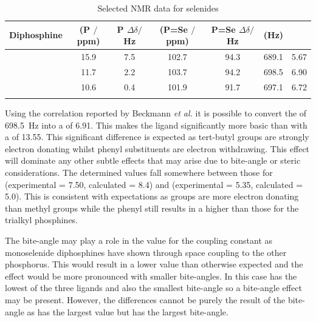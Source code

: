 {\begin{table}
\caption[Selected \phosphorus{} NMR data for \tBuxantphos{}selenides]{Selected \phosphorus{} NMR data for \tBuxantphos{}selenides}
\vspace{1em}
\label{table:selenides}
\small
\begin{center}
\begin{tabular}{l c c c c c c}
	\toprule
	\bfseries{Diphosphine} & \bfseries{\phosphorus{} (P $/$ppm)} & \bfseries{P $\Delta\delta/$Hz} &\bfseries{\phosphorus{} (P=Se $/$ppm)} & \bfseries{P=Se $\Delta\delta/$Hz} & \bfseries{\JPSe (Hz)} & \bfseries{\pKb} \\
	\midrule		
	\tBuSixantphos		&15.9	& 7.5 	& 102.7	& 94.3	& 689.1	& 5.67\\
	\tBuThixantphos	&11.7	& 2.2		& 103.7	& 94.2	& 698.5	& 6.90\\
	\tBuXantphos		&10.6	& 0.4		& 101.9	& 91.7	& 697.1	& 6.72\\
	\bottomrule{}
\end{tabular}
\end{center}
\end{table}

Using the correlation reported by Beckmann \emph{et al.} it is possible to convert the \JPSe{} of 698.5~Hz into a \pKb{} of 6.91.  This makes the ligand significantly more basic than \Phxantphos{} with a \pKb{} of 13.55.  This significant difference is expected as tert-butyl groups are strongly electron donating whilst phenyl substituents are electron withdrawing.\cite{Tolman1977}  This effect will dominate any other subtle effects that may arise due to bite-angle or steric considerations.  The determined \pKb{} values fall somewhere between those for  (experimental = 7.50, calculated = 8.4) and  (experimental = 5.35, calculated = 5.0)\cite{Beckmann2011}.  This is consistent with expectations as \tBu{} groups are more electron donating than methyl groups while the phenyl still results in a higher \pKb{} than those for the trialkyl phosphines.  

The bite-angle may play a role in the value for the \JPSe{} coupling constant as monoselenide diphosphines have shown through space coupling to the other phosphorus.\cite{Hierso2014}  This would result in a lower \JPSe{} value than otherwise expected and the effect would be more pronounced with smaller bite-angles.  In this case \tBusixantphos{} has the lowest \pKb{} of the three ligands and also the smallest bite-angle so a bite-angle effect may be present.  However, the differences cannot be purely the result of the bite-angle as \tButhixantphos{} has the largest \JPSe{} value but \tBuxantphos has the largest bite-angle.

}
